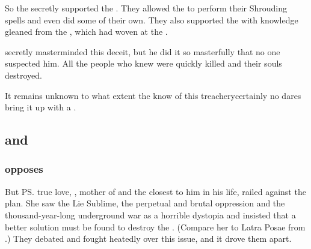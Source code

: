 So the \satharioth{} secretly supported the \SecondShrouding{}. 
They allowed the \dragons{} to perform their Shrouding spells and even did some of their own. 
They also supported the \dragons{} with knowledge gleaned from the , which \Daggerrain{} had woven at the . 

\Azraid{} secretly masterminded this deceit, but he did it so masterfully that no one suspected him. 
All the people who knew were quickly killed and their souls destroyed. 


It remains unknown to what extent the \banes{} know of this treachery\dash certainly no \resphan{} dares bring it up with a \banelord. 









\subsection{\Ishnaruchaefir{} and \Rystessakhin}





\subsubsection{\Rystessakhin{} opposes \Ishnaruchaefir}
But \ps{\Ishnaruchaefir} true love, \Triestessakhin, mother of \Nzessuacrith{} and the \dragon{} closest to him in his life, railed against the plan. 
She saw the Lie Sublime, the perpetual and brutal oppression and the thousand-year-long underground war as a horrible dystopia and insisted that a better solution must be found to destroy the \banes. 
(Compare her to Latra Posae from \cite{RobertJordan:WorldofWOT}.) 
They debated and fought heatedly over this issue, and it drove them apart. 

